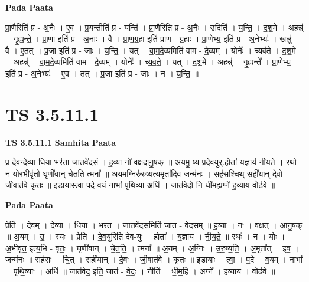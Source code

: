 \documentclass[17pt]{extarticle}
\begin{document}
\textbf{Pada Paata} \newline

प्रा॒णैरिति॑ प्र - अ॒नैः । ए॒व । प्र॒यन्तीति॑ प्र - यन्ति॑ । प्रा॒णैरिति॑ प्र - अ॒नैः । उदिति॑ । य॒न्ति॒ । द॒श॒मे । अहन्न्॑ । गृ॒ह्य॒न्ते॒ । प्रा॒णा इति॑ प्र - अ॒नाः । वै । प्रा॒ण॒ग्र॒हा इति॑ प्राण - ग्र॒हाः । प्रा॒णेभ्य॒ इति॑ प्र - अ॒नेभ्यः॑ । खलु॑ । वै । ए॒तत् । प्र॒जा इति॑ प्र - जाः । य॒न्ति॒ । यत् । वा॒म॒दे॒व्यमिति॑ वाम - दे॒व्यम् । योनेः᳚ । च्यव॑ते । द॒श॒मे । अहन्न्॑ । वा॒म॒दे॒व्यमिति॑ वाम - दे॒व्यम् । योनेः᳚ । च्य॒व॒ते॒ । यत् । द॒श॒मे । अहन्न्॑ । गृ॒ह्यन्ते᳚ । प्रा॒णेभ्य॒ इति॑ प्र - अ॒नेभ्यः॑ । ए॒व । तत् । प्र॒जा इति॑ प्र - जाः । न । य॒न्ति॒ ॥  \newline




\section*{ TS 3.5.11.1 }

\textbf{TS 3.5.11.1 } \newline
\textbf{Samhita Paata} \newline

प्र दे॒वन्दे॒व्या धि॒या भर॑ता जा॒तवे॑दसं । ह॒व्या नो॑ वक्षदानु॒षक् ॥ अ॒यमु॒ ष्य प्रदे॑व॒युर्.होता॑ य॒ज्ञाय॑ नीयते । रथो॒ न योर॒भीवृ॑तो॒ घृणी॑वान् चेतति॒ त्मना᳚ ॥ अ॒यम॒ग्निरु॑रुष्यत्य॒मृता॑दिव॒ जन्म॑नः । सह॑सश्चि॒थ् सही॑यान् दे॒वो जी॒वात॑वे कृ॒तः ॥ इडा॑यास्त्वा प॒दे व॒यं नाभा॑ पृथि॒व्या अधि॑ । जात॑वेदो॒ नि धी॑म॒ह्यग्ने॑ ह॒व्याय॒ वोढ॑वे ॥ \newline

\textbf{Pada Paata} \newline

प्रेति॑ । दे॒वम् । दे॒व्या । धि॒या । भर॑त । जा॒तवे॑दस॒मिति॑ जा॒त - वे॒द॒स॒म् ॥ ह॒व्या । नः॒ । व॒क्ष॒त् । आ॒नु॒षक् ॥ अ॒यम् । उ॒ । स्यः । प्रेति॑ । दे॒व॒युरिति॑ देव-युः । होता᳚ । य॒ज्ञाय॑ । नी॒य॒ते॒ ॥ रथः॑ । न । योः । अ॒भीवृ॑त॒ इत्य॒भि - वृ॒तः॒ । घृणी॑वान् । चे॒त॒ति॒ । त्मना᳚ ॥ अ॒यम् । अ॒ग्निः । उ॒रु॒ष्य॒ति॒ । अ॒मृता᳚त् । इ॒व॒ । जन्म॑नः ॥ सह॑सः । चि॒त् । सही॑यान् । दे॒वः । जी॒वात॑वे । कृ॒तः ॥ इडा॑याः । त्वा॒ । प॒दे । व॒यम् । नाभा᳚ । पृ॒थि॒व्याः । अधि॑ ॥ जात॑वेद॒ इति॒ जात॑ - वे॒दः॒ । नीति॑ । धी॒म॒हि॒ । अग्ने᳚ । ह॒व्याय॑ । वोढ॑वे ॥  \newline




\end{document}
